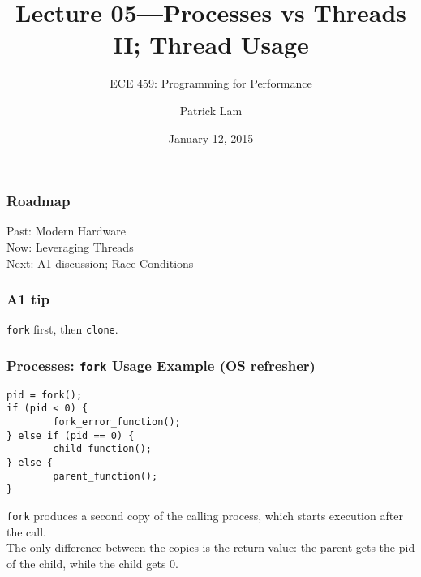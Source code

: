\documentclass[aspectratio=43]{beamer}
\title{Lecture 05---Processes vs Threads II; Thread Usage}
\subtitle{ECE 459: Programming for Performance}
\author{Patrick Lam}
\institute{University of Waterloo}
\date{January 12, 2015}
\newenvironment{changemargin}[1]{%
  \begin{list}{}{%
    \setlength{\topsep}{0pt}%
    \setlength{\leftmargin}{#1}%
    \setlength{\rightmargin}{1em}
    \setlength{\listparindent}{\parindent}%
    \setlength{\itemindent}{\parindent}%
    \setlength{\parsep}{\parskip}%
  }%
  \item[]}{\end{list}}
\begin{document}
\begin{frame}[plain]
  \titlepage
\end{frame}

\begin{frame}
  \frametitle{Roadmap}

  \Large
    \begin{changemargin}{2cm}
  Past: Modern Hardware \\[1em]

  Now: Leveraging Threads \\[1em]
  Next: A1 discussion; Race Conditions
    \end{changemargin}
  
\end{frame}

\begin{frame}
  \frametitle{A1 tip}

  \Large
  \begin{changemargin}{2cm}
    {\tt fork} first, then {\tt clone}.
  \end{changemargin}
  
\end{frame}


\begin{frame}[fragile]
  \frametitle{Processes: {\tt fork} Usage Example (OS refresher)}

  \begin{changemargin}{3cm}
    \begin{minipage}{.5\textwidth}
\begin{lstlisting}
pid = fork();
if (pid < 0) {
        fork_error_function();
} else if (pid == 0) {
        child_function();
} else {
        parent_function();
}
\end{lstlisting}
    \end{minipage}
  \end{changemargin}

  \begin{changemargin}{1cm}
     {\tt fork} produces a second copy of the calling process, which starts
          execution after the call.\\[1em]

    The only difference between the copies is the return value: the parent gets the pid of
          the child, while the child gets 0.
  \end{changemargin}
\end{frame}
\end{document}
